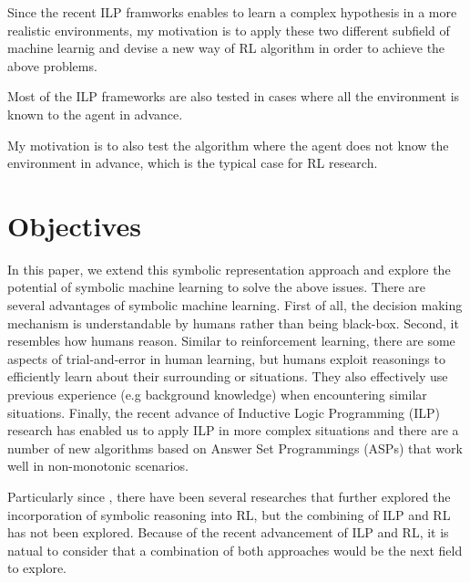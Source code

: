 Since the recent ILP framworks enables to learn a complex hypothesis in a more realistic environments, 
my motivation is to apply these two different subfield of machine learnig and devise a new way of RL algorithm in order to achieve the above problems.

Most of the ILP frameworks are also tested in cases where all the environment is known to the agent in advance. 

My motivation is to also test the algorithm where the agent does not know the environment in advance, which is the typical case for RL research.





\section{Objectives}

In this paper, we extend this symbolic representation approach and explore the potential of symbolic machine learning to solve the above issues. 
There are several advantages of symbolic machine learning. First of all, the decision making mechanism is understandable by humans rather than being black-box.
Second, it resembles how humans reason. Similar to reinforcement learning, there are some aspects of trial-and-error in human learning, but humans exploit reasonings to efficiently learn about their surrounding or situations. 
They also effectively use previous experience (e.g background knowledge) when encountering similar situations.
Finally, the recent advance of Inductive Logic Programming (ILP) research has enabled us to apply ILP in more complex situations and there are a number of new algorithms based on Answer Set Programmings (ASPs) that work well in non-monotonic scenarios.

Particularly since \cite{Garnelo2016}, there have been several researches that further explored the incorporation of symbolic reasoning into RL, but the combining of ILP and RL has not been explored. 
Because of the recent advancement of ILP and RL, it is natual to consider that a combination of both approaches would be the next field to explore.

